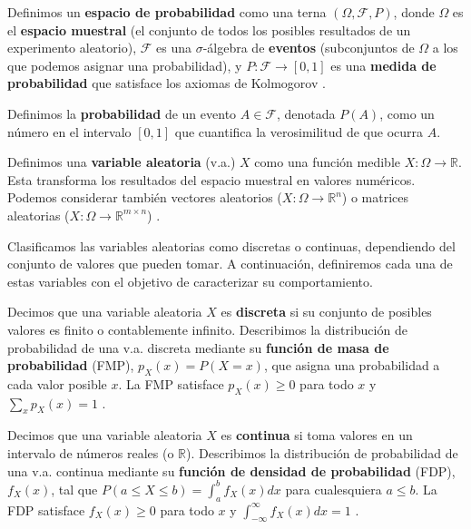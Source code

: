 \begin{definition}
\label{def:prob_space_general}
Definimos un \textbf{espacio de probabilidad} como una terna $(\Omega, \mathcal{F}, P)$, donde $\Omega$ es el \textbf{espacio muestral} (el conjunto de todos los posibles resultados de un experimento aleatorio), $\mathcal{F}$ es una $\sigma$-álgebra de \textbf{eventos} (subconjuntos de $\Omega$ a los que podemos asignar una probabilidad), y $P: \mathcal{F} \to [0, 1]$ es una \textbf{medida de probabilidad} que satisface los axiomas de Kolmogorov \citep{Ross2014}.
\end{definition}

\begin{definition}
\label{def:event_prob_general}
Definimos la \textbf{probabilidad} de un evento $A \in \mathcal{F}$, denotada $P(A)$, como un número en el intervalo $[0, 1]$ que cuantifica la verosimilitud de que ocurra $A$.
\end{definition}

\begin{definition}
\label{def:random_variable_general}
Definimos una \textbf{variable aleatoria} (v.a.) $X$ como una función medible $X: \Omega \to \mathbb{R}$. Esta transforma los resultados del espacio muestral en valores numéricos. Podemos considerar también vectores aleatorios ($X: \Omega \to \mathbb{R}^n$) o matrices aleatorias ($X: \Omega \to \mathbb{R}^{m \times n}$) \citep{CasellaBerger2002}.
\end{definition}

Clasificamos las variables aleatorias como discretas o continuas, dependiendo del conjunto de valores que pueden tomar. A continuación, definiremos cada una de estas variables con el objetivo de caracterizar su comportamiento.

\begin{definition}
\label{def:discrete_random_variable}
Decimos que una variable aleatoria $X$ es \textbf{discreta} si su conjunto de posibles valores es finito o contablemente infinito. Describimos la distribución de probabilidad de una v.a. discreta mediante su \textbf{función de masa de probabilidad} (FMP), $p_X(x) = P(X=x)$, que asigna una probabilidad a cada valor posible $x$. La FMP satisface $p_X(x) \ge 0$ para todo $x$ y $\sum_x p_X(x) = 1$ \citep{Ross2014}.
\end{definition}

\begin{definition}
\label{def:continuous_random_variable}
Decimos que una variable aleatoria $X$ es \textbf{continua} si toma valores en un intervalo de números reales (o $\mathbb{R}$). Describimos la distribución de probabilidad de una v.a. continua mediante su \textbf{función de densidad de probabilidad} (FDP), $f_X(x)$, tal que $P(a \le X \le b) = \int_a^b f_X(x) dx$ para cualesquiera $a \le b$. La FDP satisface $f_X(x) \ge 0$ para todo $x$ y $\int_{-\infty}^\infty f_X(x) dx = 1$ \citep{DeGrootSchervish2012}.
\end{definition}

